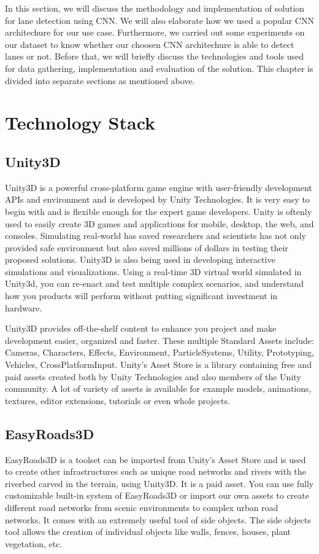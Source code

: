 \par
In this section, we will discuss the methodology and implementation of solution for lane detection using CNN. We will also elaborate how we used a popular CNN architechure for our use case. Furthermore, we carried out some experiments on our dataset to know whether our choosen CNN architechure is able to detect lanes or not. Before that, we will briefly discuss the technologies and tools used for data gathering, implementation and evaluation of the solution. This chapter is divided into separate sections as mentioned above.

\section{Technology Stack}
\subsection{Unity3D}\label{subsec:unity}
Unity3D is a powerful cross-platform game engine with user-friendly development APIs and environment and is developed by Unity Technologies. It is very easy to begin with and is flexible enough for the expert game developers. Unity is oftenly used to easily create 3D games and applications for mobile, desktop, the web, and consoles. Simulating real-world has saved researchers and scientists has not only provided safe environment but also saved millions of dollars in testing their proposed solutions. Unity3D is also being used in developing interactive simulations and visualizations. Using a real-time 3D virtual world simulated in Unity3d, you can re-enact and test multiple complex scenarios, and understand how you products will perform without putting significant investment in hardware.

\par
Unity3D\cite{unity3d} provides off-the-shelf content to enhance you project and make development easier, organized and faster. These multiple Standard Assets include: Cameras, Characters, Effects, Environment, ParticleSystems, Utility, Prototyping, Vehicles, CrossPlatformInput. Unity’s Asset Store is a library containing free and paid assets created both by Unity Technologies and also members of the Unity community. A lot of variety of assets is available for example models, animations, textures, editor extensions, tutorials or even whole projects.

\subsection{EasyRoads3D}\label{subsec:easyroad3d}
EasyRoads3D\cite{easyroads3d} is a toolset can be imported from Unity's Asset Store and is used to create other infrastructures such as unique road networks and rivers with the riverbed carved in the terrain, using Unity3D. It is a paid asset. You can use fully customizable built-in system of EasyRoads3D or import our own assets to create different road networks from scenic environments to complex urban road networks. It comes with an extremely useful tool of side objects. The side objects tool allows the creation of individual objects like walls, fences, houses, plant vegetation, etc.

